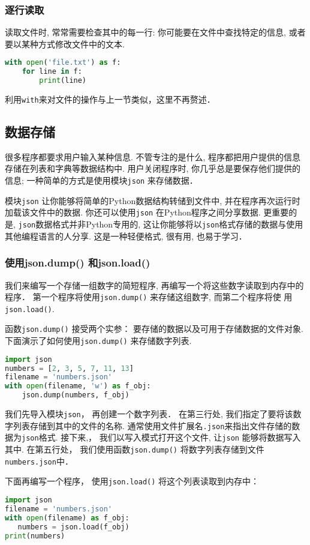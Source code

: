 \subsubsection{逐行读取}
读取文件时, 常常需要检查其中的每一行: 你可能要在文件中查找特定的信息, 或者要以某种方式修改文件中的文本.
\begin{lstlisting}[language=python]
with open('file.txt') as f:
    for line in f:
        print(line)
\end{lstlisting}

利用\verb|with|来对文件的操作与上一节类似，这里不再赘述．

\subsection{数据存储}
很多程序都要求用户输入某种信息. 不管专注的是什么, 程序都把用户提供的信息存储在列表和字典等数据结构中.  用户关闭程序时, 你几乎总是要保存他们提供的信息; 一种简单的方式是使用模块\verb|json| 来存储数据．

模块\verb|json| 让你能够将简单的Python数据结构转储到文件中, 并在程序再次运行时加载该文件中的数据. 你还可以使用\verb|json| 在Python程序之间分享数据. 更重要的是, \verb|json|数据格式并非Python专用的, 这让你能够将以\verb|json|格式存储的数据与使用其他编程语言的人分享. 这是一种轻便格式, 很有用, 也易于学习．

\subsubsection{使用json.dump() 和json.load()}
我们来编写一个存储一组数字的简短程序, 再编写一个将这些数字读取到内存中的程序． 第一个程序将使用\verb|json.dump()| 来存储这组数字, 而第二个程序将使
用\verb|json.load()|.

函数\verb|json.dump()| 接受两个实参： 要存储的数据以及可用于存储数据的文件对象. 下面演示了如何使用\verb|json.dump()| 来存储数字列表.
\begin{lstlisting}[language=python]
import json
numbers = [2, 3, 5, 7, 11, 13]
filename = 'numbers.json'
with open(filename, 'w') as f_obj:
    json.dump(numbers, f_obj)
\end{lstlisting}
我们先导入模块\verb|json|， 再创建一个数字列表． 在第三行处, 我们指定了要将该数字列表存储到其中的文件的名称. 通常使用文件扩展名\verb|.json|来指出文件存储的数据为\verb|json|格式. 接下来,， 我们以写入模式打开这个文件, 让\verb|json| 能够将数据写入其中. 在第五行处， 我们使用函数\verb|json.dump()| 将数字列表存储到文件\verb|numbers.json|中．

下面再编写一个程序， 使用\verb|json.load()| 将这个列表读取到内存中：

\begin{lstlisting}[language=python]
import json
filename = 'numbers.json'
with open(filename) as f_obj:
   numbers = json.load(f_obj)
print(numbers)
\end{lstlisting}
